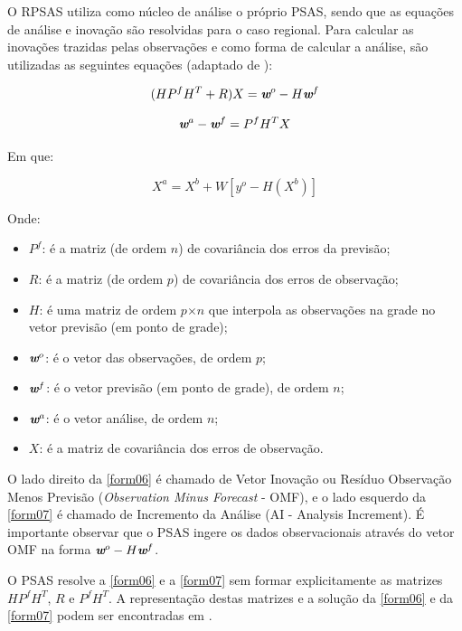 O RPSAS utiliza como núcleo de análise o próprio PSAS, sendo que as equações de análise e inovação são resolvidas para o caso regional. Para calcular as inovações trazidas pelas observações e como forma de calcular a análise, são utilizadas as seguintes equações (adaptado de ):

\begin{equation}
(HP^{f}H^{T}+R)X=\textit{\textbf{w}}^o-H\textit{\textbf{w}}^f
\label{form01}
\end{equation}

\begin{equation}
\textit{\textbf{w}}^a-\textit{\textbf{w}}^f=P^{f}H^{T}X
\label{form02}
\end{equation}

Em que:

\begin{equation}
X^{a}=X^{b}+W[y^{o}-H(X^{b})]
\label{form03}
\end{equation}

Onde:

\begin{itemize}
\item $P^{f}$: é a matriz (de ordem $n$) de covariância dos erros da previsão;
\item $R$: é a matriz (de ordem $p$) de covariância dos erros de observação;
\item $H$: é uma matriz de ordem $p$$\times$$n$ que interpola as observações na grade no vetor previsão (em ponto de grade);
\item $\textit{\textbf{w}}^o$: é o vetor das observações, de ordem $p$;
\item $\textit{\textbf{w}}^f$: é o vetor previsão (em ponto de grade), de ordem $n$;
\item $\textit{\textbf{w}}^a$: é o vetor análise, de ordem $n$;
\item $\textit{X}$: é a matriz de covariância dos erros de observação.
\end{itemize}

O lado direito da \autoref{form06} é chamado de Vetor Inovação ou Resíduo Observação Menos Previsão (\textit{Observation Minus Forecast} - OMF), e o lado esquerdo da \autoref{form07} é chamado de Incremento da Análise (AI - Analysis Increment). É importante observar que o PSAS ingere os dados observacionais através do vetor OMF na forma $\textit{\textbf{w}}^o-H\textit{\textbf{w}}^f$.

O PSAS resolve a \autoref{form06} e a \autoref{form07} sem formar explicitamente as matrizes $HP^{f}H^{T}$, $R$ e $P^{f}H^{T}$. A representação destas matrizes e a solução da \autoref{form06} e da \autoref{form07} podem ser encontradas em .

